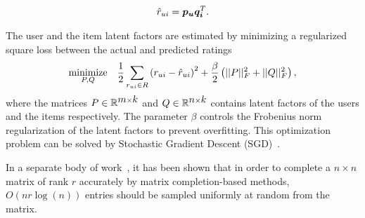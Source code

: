\begin{equation} \label{mf_eq}
  \begin{split}
    \mbox{$\mathop{\hat{r}_{ui}}$} = \bm{p_u}\bm{q_i}^T.
  \end{split}
\end{equation}

The user and the item latent factors are estimated by minimizing a regularized
square loss between the actual and predicted ratings 
\begin{equation} \label{mf_obj}
  \begin{aligned}
    \minimize_{P, Q} & &\frac{1}{2}\sum_{r_{ui} \in R}
    \left(r_{ui} - \ruih \right)^2+ \frac{\beta}{2}
    \left(||P||_F^2 + ||Q||_F^2 \right),
  \end{aligned}
\end{equation}
where the matrices $\mbox{$P$} \in \mathbb{R}^{\mbox{$m$} \times \mbox{$k$}}$ and $\mbox{$Q$} \in \mathbb{R}^{\mbox{$n$} \times \mbox{$k$}}$ 
contains latent factors of the users and the items respectively. The parameter
$\beta$ controls the Frobenius norm regularization of the latent factors to prevent overfitting. This optimization problem can be solved by Stochastic Gradient Descent (SGD)~\cite{bottou2010large}.

In a separate body of work~\cite{CandesTao2010, CandesRecht09}, it has been shown that in order to complete a $n \times n$ matrix of rank $r$
accurately by matrix completion-based methods, $O(nr \log(n))$ entries should be sampled uniformly at random from the matrix.

\iffalse
In real-world recommendation systems, it is not possible for a user to indicate
his or her preferences over all the available items thereby leading to missing
ratings in the user-item rating matrix. There has been some work that assumes
all ratings are \emph{missing not at random} (MNAR) and models the missing data to improve the
generated recommendations~\cite{marlin2012collaborative, pan2008one,
hernandez2014probabilistic, Steck2010MNAR, Steck2013EvalRec, lim2015top,
KimRecsys2014}.

However, in our work, we focus on investigating how
do the missing ratings, i.e., both \emph{missing at random} (MAR) and \emph{missing not at
random} (MNAR), or specifically how does the presence of few ratings for the
users and the items affect the matrix completion-based methods. We use our analysis
to develop a matrix completion-based approach to improve recommendations for the
users who have provided few ratings on items or for the items that have
received few ratings from the users.
\fi

